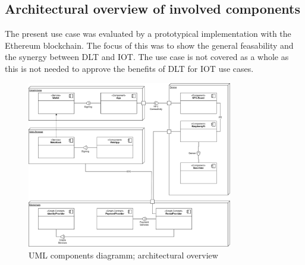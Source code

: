\documentclass[conference]{IEEEtran}
\begin{document}
\subsection{Architectural overview of involved components}
The present use case was evaluated by a prototypical implementation with the Ethereum blockchain. The focus of this was to show the general feasability and the synergy between DLT and IOT. The use case is not covered as a whole as this is not needed to approve the benefits of DLT for IOT use cases.\\

\begin{figure}[hbt]
 \centering
 \includegraphics[width=0.8\textwidth]{media/Architecture.png}
 \caption{UML components diagramm; architectural overview}
 \label{fig:architecture}
\end{figure}
\end{document}
